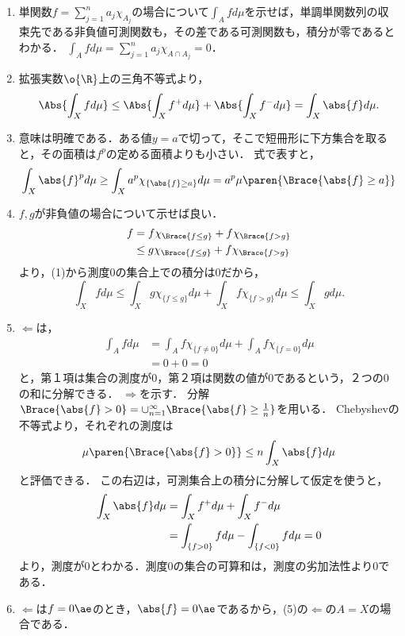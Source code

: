 \documentclass[uplatex, dvipdfmx]{jsreport}
\begin{document}
\begin{Proof}\mbox{}
    \begin{enumerate}
        \item 単関数$f=\sum^n_{j=1}a_j\chi_{A_j}$の場合について$\int_Afd\mu$を示せば，単調単関数列の収束先である非負値可測関数も，その差である可測関数も，積分が零であるとわかる．
        $\int_Afd\mu=\sum^n_{j=1}a_j\chi_{A\cap A_j}=0$．
        \item 
        拡張実数$\o{\R}$上の三角不等式より，
        \[\Abs{\int_Xfd\mu}\le\Abs{\int_Xf^+d\mu}+\Abs{\int_Xf^-d\mu}=\int_X\abs{f}d\mu.\]
        \item 意味は明確である．ある値$y=a$で切って，そこで短冊形に下方集合を取ると，その面積は$f^p$の定める面積よりも小さい．
        式で表すと，
        \[\int_X\abs{f}^pd\mu\ge\int_Xa^p\chi_{\{\abs{f}\ge a\}}d\mu=a^p\mu\paren{\Brace{\abs{f}\ge a}}\]
        \item $f,g$が非負値の場合について示せば良い．
        \begin{align*}
            f&=f\chi_{\Brace{f\le g}}+f\chi_{\Brace{f>g}}\\
            &\le g\chi_{\Brace{f\le g}}+f\chi_{\Brace{f>g}}
        \end{align*}
        より，(1)から測度$0$の集合上での積分は$0$だから，
        \[\int_Xfd\mu\le\int_Xg\chi_{\{f\le g\}}d\mu+\int_Xf\chi_{\{f>g\}}d\mu\le\int_Xgd\mu.\]
        \item $\Leftarrow$は，
        \begin{align*}
            \int_Afd\mu&=\int_Af\chi_{\{f\ne 0\}}d\mu+\int_Af\chi_{\{f=0\}}d\mu\\
            &=0+0=0
        \end{align*}
        と，第１項は集合の測度が$0$，第２項は関数の値が$0$であるという，２つの$0$の和に分解できる．
        $\Rightarrow$を示す．
        分解$\Brace{\abs{f}>0}=\cup^\infty_{n=1}\Brace{\abs{f}\ge\frac{1}{n}}$を用いる．
        Chebyshevの不等式より，それぞれの測度は
        \[\mu\paren{\Brace{\abs{f}>0}}\le n\int_X\abs{f}d\mu\]
        と評価できる．
        この右辺は，可測集合上の積分に分解して仮定を使うと，
        \begin{align*}
            \int_X\abs{f}d\mu&=\int_Xf^+d\mu+\int_Xf^-d\mu\\
            &=\int_{\{f>0\}}fd\mu-\int_{\{f<0\}}fd\mu=0
        \end{align*}
        より，測度が$0$とわかる．測度$0$の集合の可算和は，測度の劣加法性より$0$である．
        \item 
        $\Leftarrow$は$f=0\ae$のとき，$\abs{f}=0\ae$であるから，(5)の$\Leftarrow$の$A=X$の場合である．

\end{enumerate}
\end{Proof}
\end{document}
